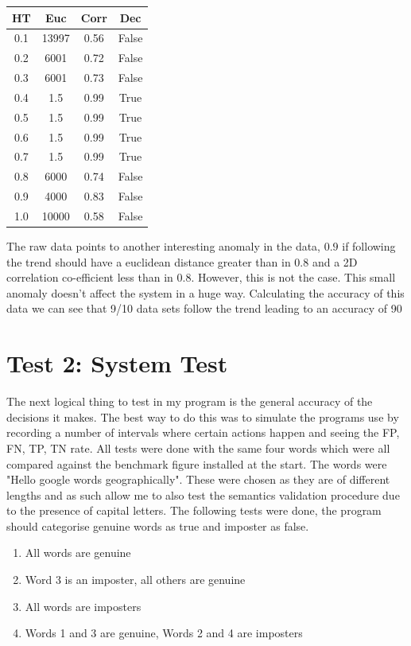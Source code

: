 \documentclass[10pt,a4paper]{report}
\begin{document}
\begin{center}
	\begin{tabular}{|c|c|c|c|}
	\hline
	HT & Euc & Corr & Dec \\ [0.5ex]
	\hline
	\hline
	0.1 & 13997 & 0.56 & False \\
	0.2 & 6001 & 0.72 & False \\
	0.3 & 6001 & 0.73 & False \\
	0.4 & 1.5 & 0.99 & True \\
	0.5 & 1.5 & 0.99 & True \\
	0.6 & 1.5 & 0.99 & True \\
	0.7 & 1.5 & 0.99 & True \\
	0.8 & 6000 & 0.74 & False \\
	0.9 & 4000 & 0.83 & False \\
	1.0 & 10000 & 0.58 & False \\
	\hline
	\end{tabular}
\end{center}

The raw data points to another interesting anomaly in the data, \(0.9\) if following the trend should have a euclidean distance greater than in \(0.8\) and a 2D correlation co-efficient less than in \(0.8\). However, this is not the case. This small anomaly doesn't affect the system in a huge way. Calculating the accuracy of this data we can see that 9/10 data sets follow the trend leading to an accuracy of 90%

\section{Test 2: System Test}

The next logical thing to test in my program is the general accuracy of the decisions it makes. The best way to do this was to simulate the programs use by recording a number of intervals where certain actions happen and seeing the FP, FN, TP, TN rate. All tests were done with the same four words which were all compared against the benchmark figure installed at the start. The words were "Hello google words geographically". These were chosen as they are of different lengths and as such allow me to also test the semantics validation procedure due to the presence of capital letters. The following tests were done, the program should categorise genuine words as true and imposter as false.

\begin{enumerate}
	\item All words are genuine 
	\item Word 3 is an imposter, all others are genuine
	\item All words are imposters
	\item Words 1 and 3 are genuine, Words 2 and 4 are imposters
\end{enumerate}
\end{document}
